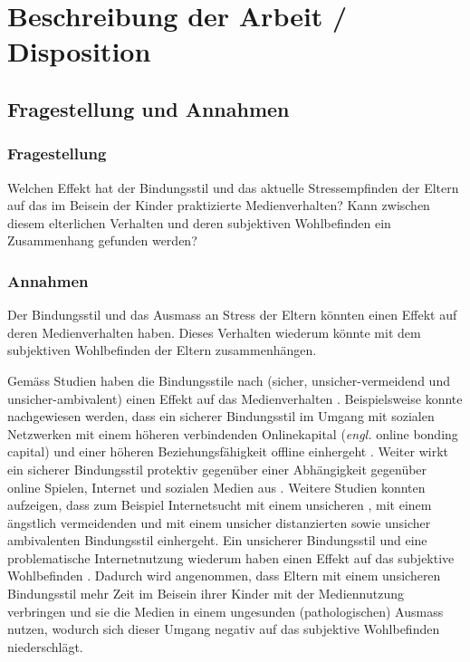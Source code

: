 \section{Beschreibung der Arbeit / Disposition}
\subsection{Fragestellung und Annahmen}
\subsubsection{Fragestellung}
Welchen Effekt hat der Bindungsstil und das aktuelle Stressempfinden der Eltern auf das im Beisein der Kinder praktizierte Medienverhalten? Kann zwischen diesem elterlichen Verhalten und deren subjektiven Wohlbefinden ein Zusammenhang gefunden werden?
\subsubsection{Annahmen}
Der Bindungsstil und das Ausmass an Stress der Eltern könnten einen Effekt auf deren Medienverhalten haben. Dieses Verhalten wiederum könnte mit dem subjektiven Wohlbefinden der Eltern zusammenhängen.

Gemäss Studien haben die Bindungsstile nach  (sicher, unsicher-vermeidend und unsicher-ambivalent) einen Effekt auf das Medienverhalten \cite{Lin2015, Monacis2017}. Beispielsweise konnte nachgewiesen werden, dass ein sicherer Bindungsstil im Umgang mit sozialen Netzwerken mit einem höheren verbindenden Onlinekapital (\textit{engl. }online bonding capital) und einer höheren Beziehungsfähigkeit offline  einhergeht \cite{Lin2015}. Weiter wirkt ein sicherer Bindungsstil protektiv gegenüber einer Abhängigkeit gegenüber online Spielen, Internet und sozialen Medien aus \cite{Monacis2017}.  
Weitere Studien konnten aufzeigen, dass zum Beispiel Internetsucht mit einem unsicheren \cite{Lin2011, Severino2013}, mit einem ängstlich vermeidenden \cite{Shin2011} und mit einem unsicher distanzierten sowie unsicher ambivalenten Bindungsstil \cite{Odaci2014} einhergeht. Ein unsicherer Bindungsstil und eine problematische Internetnutzung wiederum haben einen Effekt auf das subjektive Wohlbefinden \cite{Odaci2014}.	 
Dadurch wird angenommen, dass Eltern mit einem unsicheren Bindungsstil mehr Zeit im Beisein ihrer Kinder mit der Mediennutzung verbringen und sie die Medien in einem ungesunden (pathologischen) Ausmass nutzen, wodurch sich dieser Umgang negativ auf das subjektive Wohlbefinden niederschlägt.  

